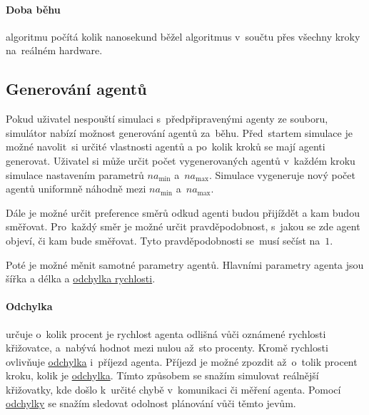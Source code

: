 \paragraph{Doba běhu}\label{par:doba_behu} algoritmu počítá kolik nanosekund běžel algoritmus
v~součtu přes všechny kroky na~reálném hardware.

\subsection{Generování agentů}\label{subsec:generovani_agentu}


Pokud uživatel nespouští simulaci s~předpřipravenými agenty ze souboru,
simulátor nabízí možnost generování agentů za~běhu.
Před~startem simulace je možné navolit~si určité vlastnosti agentů a po~kolik kroků se mají agenti generovat.
Uživatel si může určit počet vygenerovaných agentů v~každém kroku simulace nastavením parametrů $na_{\min}$ a~$na_{\max}$.
Simulace vygeneruje nový počet agentů uniformně náhodně mezi $na_{\min}$ a~$na_{\max}$.  %

Dále je možné určit preference směrů odkud agenti budou přijíždět a kam budou směřovat.
Pro~každý směr je možné určit pravděpodobnost, s~jakou se zde agent objeví, či kam bude směřovat.
Tyto pravděpodobnosti se~musí sečíst na~$1$.

Poté je možné měnit samotné parametry agentů.
Hlavními parametry agenta jsou šířka a délka a \hyperref[par:odchylka]{odchylka rychlosti}.

\paragraph{Odchylka}\label{par:odchylka} určuje o~kolik procent je rychlost agenta odlišná
vůči oznámené rychlosti křižovatce, a~nabývá hodnot mezi nulou až~sto procenty.
Kromě rychlosti ovlivňuje \hyperref[par:odchylka]{odchylka} i~příjezd agenta.
Příjezd je možné zpozdit až~o~tolik procent kroku, kolik je \hyperref[par:odchylka]{odchylka}.
Tímto způsobem se snažím simulovat reálnější křižovatky, kde došlo k~určité chybě v~komunikaci či měření agenta.
Pomocí \hyperref[par:odchylka]{odchylky} se snažím sledovat odolnost plánování vůči těmto jevům.
